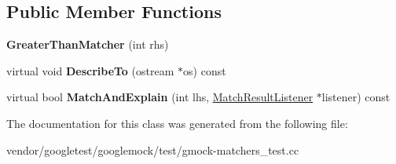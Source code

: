 \subsection*{Public Member Functions}
\begin{DoxyCompactItemize}
\item 
\mbox{\label{classtesting_1_1gmock__matchers__test_1_1_greater_than_matcher_a605c50137599a1dba0701bbd735bf1e8}} 
{\bfseries Greater\+Than\+Matcher} (int rhs)
\item 
\mbox{\label{classtesting_1_1gmock__matchers__test_1_1_greater_than_matcher_a49ea904382d0f5b80ccf622423ab0d94}} 
virtual void {\bfseries Describe\+To} (ostream $\ast$os) const
\item 
\mbox{\label{classtesting_1_1gmock__matchers__test_1_1_greater_than_matcher_a85a583852003638507d872238bcf7c0f}} 
virtual bool {\bfseries Match\+And\+Explain} (int lhs, \mbox{\hyperlink{classtesting_1_1_match_result_listener}{Match\+Result\+Listener}} $\ast$listener) const
\end{DoxyCompactItemize}


The documentation for this class was generated from the following file\+:\begin{DoxyCompactItemize}
\item 
vendor/googletest/googlemock/test/gmock-\/matchers\+\_\+test.\+cc\end{DoxyCompactItemize}

